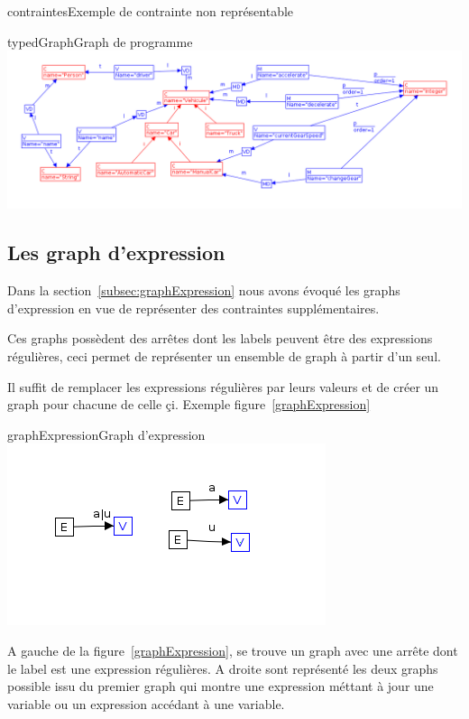 \documentclass[a4paper, 12pt]{article}
\begin{document}
\begin{figu}{contraintes}{Exemple de contrainte non représentable}
\begin{myfig}{typedGraph}{Graph de programme}
\includegraphics[width=\textwidth]{typedGraph.png}
\end{myfig}

\subsection{Les graph d'expression}

Dans la section~\ref{subsec:graphExpression} nous avons évoqué les graphs d'expression en vue de représenter des contraintes supplémentaires.

Ces graphs possèdent des arrêtes dont les labels peuvent être des expressions régulières, ceci permet de représenter un ensemble de graph à partir d'un seul.

Il suffit de remplacer les expressions régulières par leurs valeurs et de créer un graph pour chacune de celle çi. Exemple figure~\ref{graphExpression}

\begin{myfig}{graphExpression}{Graph d'expression}
\includegraphics{graphExpression.png}
\end{myfig}

A gauche de la figure~\ref{graphExpression}, se trouve un graph avec une arrête dont le label est une expression régulières. A droite sont représenté les deux graphs possible issu du premier graph qui montre une expression méttant à jour une variable ou un expression accédant à une variable.


\end{figu}
\end{document}

